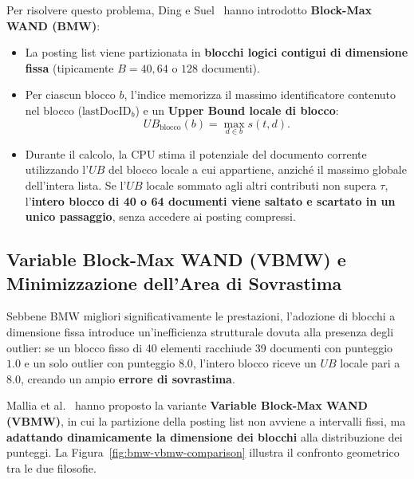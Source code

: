 Per risolvere questo problema, Ding e Suel~\cite{ding2011} hanno introdotto \textbf{Block-Max WAND (BMW)}:
\begin{itemize}
    \item La posting list viene partizionata in \textbf{blocchi logici contigui di dimensione fissa} (tipicamente $B = 40, 64 \text{ o } 128$ documenti).
    \item Per ciascun blocco $b$, l'indice memorizza il massimo identificatore contenuto nel blocco ($\text{lastDocID}_b$) e un \textbf{Upper Bound locale di blocco}:
    \begin{equation}
        UB_{\text{blocco}}(b) = \max_{d \in b} s(t, d).
    \end{equation}
    \item Durante il calcolo, la CPU stima il potenziale del documento corrente utilizzando l'$UB$ del blocco locale a cui appartiene, anzich\'e il massimo globale dell'intera lista. Se l'$UB$ locale sommato agli altri contributi non supera $\tau$, l'\textbf{intero blocco di 40 o 64 documenti viene saltato e scartato in un unico passaggio}, senza accedere ai posting compressi.
\end{itemize}

\FloatBarrier
\subsection{Variable Block-Max WAND (VBMW) e Minimizzazione dell'Area di Sovrastima}
Sebbene BMW migliori significativamente le prestazioni, l'adozione di blocchi a dimensione fissa introduce un'inefficienza strutturale dovuta alla presenza degli outlier: se un blocco fisso di 40 elementi racchiude 39 documenti con punteggio $1.0$ e un solo outlier con punteggio $8.0$, l'intero blocco riceve un $UB$ locale pari a $8.0$, creando un ampio \textbf{errore di sovrastima}.

Mallia et al.~\cite{mallia2017} hanno proposto la variante \textbf{Variable Block-Max WAND (VBMW)}, in cui la partizione della posting list non avviene a intervalli fissi, ma \textbf{adattando dinamicamente la dimensione dei blocchi} alla distribuzione dei punteggi. La Figura~\ref{fig:bmw-vbmw-comparison} illustra il confronto geometrico tra le due filosofie.

